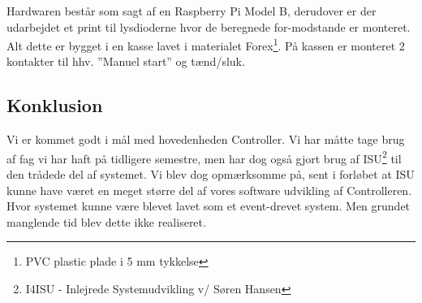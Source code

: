 Hardwaren består som sagt af en Raspberry Pi Model B, derudover er der udarbejdet et print til lysdioderne hvor de beregnede for-modstande er monteret. Alt dette er bygget i en kasse lavet i materialet Forex\footnote{PVC plastic plade i 5 mm tykkelse}. På kassen er monteret 2 kontakter til hhv. ''Manuel start'' og tænd/sluk.

\subsection{Konklusion}

Vi er kommet godt i mål med hovedenheden Controller. Vi har måtte tage brug af fag vi har haft på tidligere semestre, men har dog også gjort brug af ISU\footnote{I4ISU - Inlejrede Systemudvikling v/ Søren Hansen} til den trådede del af systemet. Vi blev dog opmærksomme på, sent i forløbet at ISU kunne have været en meget større del af vores software udvikling af Controlleren. Hvor systemet kunne være blevet lavet som et event-drevet system. Men grundet manglende tid blev dette ikke realiseret.